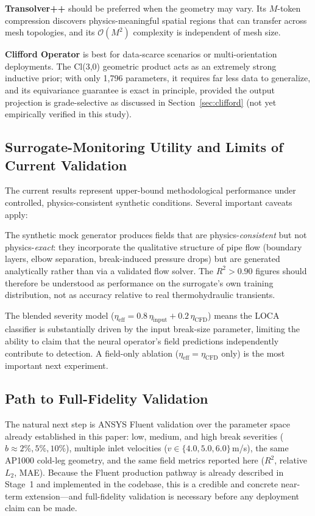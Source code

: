 \documentclass[journal]{IEEEtran}
\begin{document}
\textbf{Transolver++} should be preferred when the geometry may vary. Its $M$-token compression discovers physics-meaningful spatial regions that can transfer across mesh topologies, and its $\mathcal{O}(M^2)$ complexity is independent of mesh size.

\textbf{Clifford Operator} is best for data-scarce scenarios or multi-orientation deployments. The Cl(3,0) geometric product acts as an extremely strong inductive prior; with only 1,796 parameters, it requires far less data to generalize, and its equivariance guarantee is exact in principle, provided the output projection is grade-selective as discussed in Section~\ref{sec:clifford} (not yet empirically verified in this study).

\subsection{Surrogate-Monitoring Utility and Limits of Current Validation}

The current results represent upper-bound methodological performance under controlled, physics-consistent synthetic conditions. Several important caveats apply:

The synthetic mock generator produces fields that are physics-\emph{consistent} but not physics-\emph{exact}: they incorporate the qualitative structure of pipe flow (boundary layers, elbow separation, break-induced pressure drops) but are generated analytically rather than via a validated flow solver. The $R^2 > 0.90$ figures should therefore be understood as performance on the surrogate's own training distribution, not as accuracy relative to real thermohydraulic transients.

The blended severity model ($\eta_\text{eff} = 0.8\,\eta_\text{input} + 0.2\,\eta_\text{CFD}$) means the LOCA classifier is substantially driven by the input break-size parameter, limiting the ability to claim that the neural operator's field predictions independently contribute to detection. A field-only ablation ($\eta_\text{eff} = \eta_\text{CFD}$ only) is the most important next experiment.

\subsection{Path to Full-Fidelity Validation}

The natural next step is ANSYS Fluent validation over the parameter space already established in this paper: low, medium, and high break severities ($b \approx 2\%, 5\%, 10\%$), multiple inlet velocities ($v \in \{4.0, 5.0, 6.0\}$\,m/s), the same AP1000 cold-leg geometry, and the same field metrics reported here ($R^2$, relative $L_2$, MAE). Because the Fluent production pathway is already described in Stage~1 and implemented in the codebase, this is a credible and concrete near-term extension---and full-fidelity validation is necessary before any deployment claim can be made.
\end{document}
